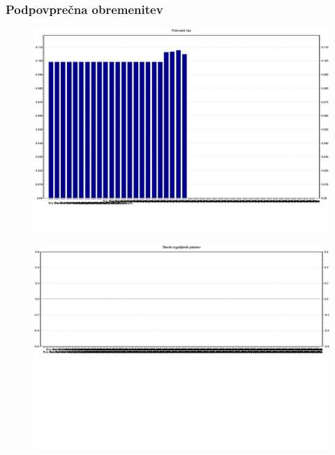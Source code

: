\documentclass[11pt,a4paper,slovene]{myarticle}
\begin{document}
\subsubsection{Podpovprečna obremenitev}
\begin{figure}[H]
\includegraphics[scale=0.40]{slike/bus/PODpotovalniCas.png}
\end{figure}
\begin{figure}[H]
\includegraphics[scale=0.40]{slike/bus/PODstIzgubljenihPaketov.png}
\end{figure}
\end{document}
